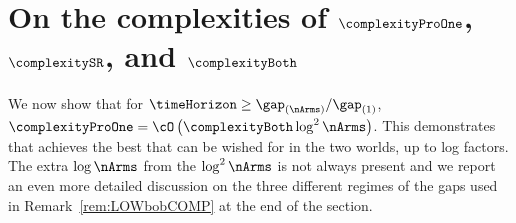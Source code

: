 \section{On the complexities of $\complexityProOne$, $\complexitySR$, and 
	$\complexityBoth$}  %
\label{s:moreOnRem}
%
%
 We now show that for $\timeHorizon\geq\gap_{(\nArms)}/\gap_{(1)}$,
	$\complexityProOne = \cO\left(\complexityBoth\log^2\nArms\right)$. 
	This demonstrates that \Pone{} achieves the best 
	that can be wished for in the two worlds, up to log
	 factors.
	The extra $\log\nArms$ from the $\log^2\nArms$ is not always
	present  and we report an 
	even more detailed discussion on the three different regimes of the
	gaps used in 
	Remark~\ref{rem:LOWbobCOMP}  at the end of the section.
	\setcounter{scratchcounter}{\value{theorem}}
	\cocores*
	\setcounter{theorem}{\the\numexpr\value{scratchcounter}}
